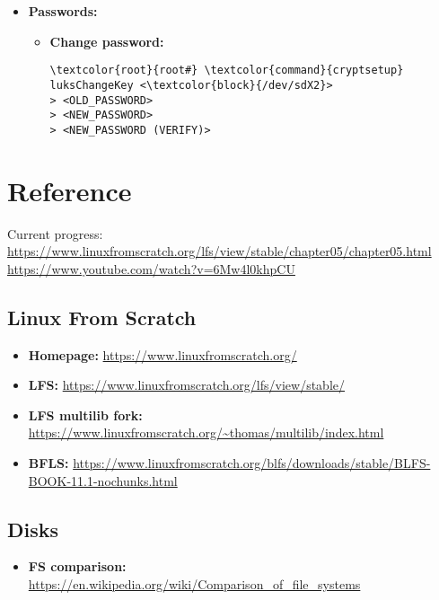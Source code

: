 \documentclass[10pt, a4paper, onecolumn, oneside, titlepage, openany]{book}
\begin{document}
\begin{itemize}
\begin{enumerate}
\begin{Verbatim}[commandchars=\\\{\}]
--header-backup-file <\textcolor{file}{FILE}>
> YES
\end{Verbatim}
    \end{enumerate}
    \item \textbf{Passwords:}
    \begin{itemize}
        \item \textbf{Change password:}
\begin{Verbatim}[commandchars=\\\{\}]
\textcolor{root}{root#} \textcolor{command}{cryptsetup} luksChangeKey <\textcolor{block}{/dev/sdX2}>
> <OLD_PASSWORD>
> <NEW_PASSWORD>
> <NEW_PASSWORD (VERIFY)>
\end{Verbatim}
    \end{itemize}
\end{itemize}


\chapter{Reference}
Current progress:
\newline \url{https://www.linuxfromscratch.org/lfs/view/stable/chapter05/chapter05.html}
\newline \url{https://www.youtube.com/watch?v=6Mw4l0khpCU}
\section{Linux From Scratch}
\begin{itemize}
    \item \textbf{Homepage:} \url{https://www.linuxfromscratch.org/}
    \item \textbf{LFS:} \url{https://www.linuxfromscratch.org/lfs/view/stable/}
    \item \textbf{LFS multilib fork:} \url{https://www.linuxfromscratch.org/~thomas/multilib/index.html}
    \item \textbf{BFLS:} \url{https://www.linuxfromscratch.org/blfs/downloads/stable/BLFS-BOOK-11.1-nochunks.html}
\end{itemize}

\section{Disks}
\begin{itemize}
    \item \textbf{FS comparison:} \url{https://en.wikipedia.org/wiki/Comparison_of_file_systems}
\end{itemize}
\end{document}
